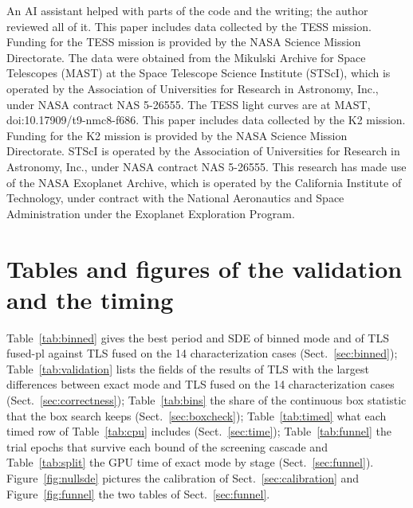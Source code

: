 \documentclass{aastex631}
\begin{document}
\begin{acknowledgments}
An AI assistant helped with parts of the code and the writing; the author reviewed all of it.
This paper includes data collected by the TESS mission. Funding for the TESS mission is provided by the NASA Science Mission Directorate. The data were obtained from the Mikulski Archive for Space Telescopes (MAST) at the Space Telescope Science Institute (STScI), which is operated by the Association of Universities for Research in Astronomy, Inc., under NASA contract NAS 5-26555. The TESS light curves are at MAST, doi:10.17909/t9-nmc8-f686.
This paper includes data collected by the K2 mission. Funding for the K2 mission is provided by the NASA Science Mission Directorate. STScI is operated by the Association of Universities for Research in Astronomy, Inc., under NASA contract NAS 5-26555.
This research has made use of the NASA Exoplanet Archive, which is operated by the California Institute of Technology, under contract with the National Aeronautics and Space Administration under the Exoplanet Exploration Program.
\end{acknowledgments}

\appendix
\section{Tables and figures of the validation and the timing}\label{sec:appendix}
Table~\ref{tab:binned} gives the best period and SDE of binned mode and of TLS fused-pl against TLS fused on the 14 characterization cases (Sect.~\ref{sec:binned}); Table~\ref{tab:validation} lists the fields of the results of TLS with the largest differences between exact mode and TLS fused on the 14 characterization cases (Sect.~\ref{sec:correctness}); Table~\ref{tab:bins} the share of the continuous box statistic that the box search keeps (Sect.~\ref{sec:boxcheck}); Table~\ref{tab:timed} what each timed row of Table~\ref{tab:cpu} includes (Sect.~\ref{sec:time}); Table~\ref{tab:funnel} the trial epochs that survive each bound of the screening cascade and Table~\ref{tab:split} the GPU time of exact mode by stage (Sect.~\ref{sec:funnel}). Figure~\ref{fig:nullsde} pictures the calibration of Sect.~\ref{sec:calibration} and Figure~\ref{fig:funnel} the two tables of Sect.~\ref{sec:funnel}.

\begin{table}[htbp]
\centering
\caption{Best period and SDE of TLS binned and TLS fused-pl against TLS fused on the 14 characterization cases.}\label{tab:binned}
\small

\end{table}
\end{document}
